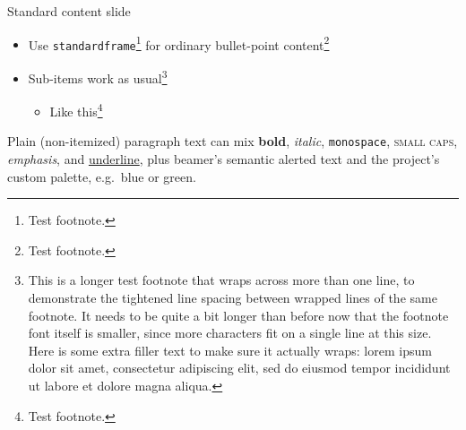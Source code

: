 
\begin{standardframe}{Standard content slide}
	\begin{itemize}
		\item Use \texttt{standardframe}\footnote{Test footnote.} for ordinary bullet-point content\footnote{Test footnote.}
		\item Sub-items work as usual\footnote{This is a longer test footnote that wraps across more than one line, to demonstrate the tightened line spacing between wrapped lines of the same footnote. It needs to be quite a bit longer than before now that the footnote font itself is smaller, since more characters fit on a single line at this size. Here is some extra filler text to make sure it actually wraps: lorem ipsum dolor sit amet, consectetur adipiscing elit, sed do eiusmod tempor incididunt ut labore et dolore magna aliqua.}
		\begin{itemize}
			\item Like this\footnote{Test footnote.}
		\end{itemize}
	\end{itemize}

	\vspace{1em}
	\noindent Plain (non-itemized) paragraph text can mix \textbf{bold},
	\textit{italic}, \texttt{monospace}, \textsc{small caps}, \emph{emphasis},
	and \underline{underline}, plus beamer's semantic \alert{alerted text}
	and the project's custom palette, e.g.\
	\textcolor{c_secondary_blue}{blue} or
	\textcolor{c_secondary_green}{green}.
\end{standardframe}
